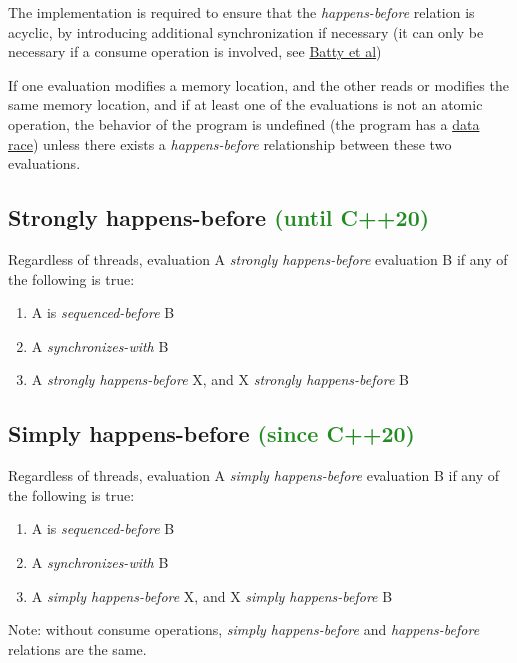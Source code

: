 \documentclass[a4paper,12pt,notitlepage,twoside,openright]{article}
\begin{document}
The implementation is required to ensure that the \emph{happens-before}
relation is acyclic, by introducing additional synchronization if
necessary (it can only be necessary if a consume operation is involved,
see \href{http://www.cl.cam.ac.uk/~pes20/cpp/popl085ap-sewell.pdf}{Batty
et al})

If one evaluation modifies a memory location, and the other reads or
modifies the same memory location, and if at least one of the
evaluations is not an atomic operation, the behavior of the program is
undefined (the program has a
\href{https://en.cppreference.com/w/cpp/language/memory_model}{data
race}) unless there exists a \emph{happens-before} relationship between
these two evaluations.

\subsection{Strongly happens-before \textcolor{ForestGreen}{(until C++20)}}

Regardless of threads, evaluation A \emph{strongly happens-before}
evaluation B if any of the following is true:

\begin{enumerate}

\item
  A is \emph{sequenced-before} B
\item
  A \emph{synchronizes-with} B
\item
  A \emph{strongly happens-before} X, and X \emph{strongly
  happens-before} B
\end{enumerate}

\subsection{Simply happens-before \textcolor{ForestGreen}{(since C++20)}}

Regardless of threads, evaluation A \emph{simply happens-before}
evaluation B if any of the following is true:

\begin{enumerate}

\item
  A is \emph{sequenced-before} B
\item
  A \emph{synchronizes-with} B
\item
  A \emph{simply happens-before} X, and X \emph{simply happens-before} B
\end{enumerate}

Note: without consume operations, \emph{simply happens-before} and
\emph{happens-before} relations are the same.
\end{document}
